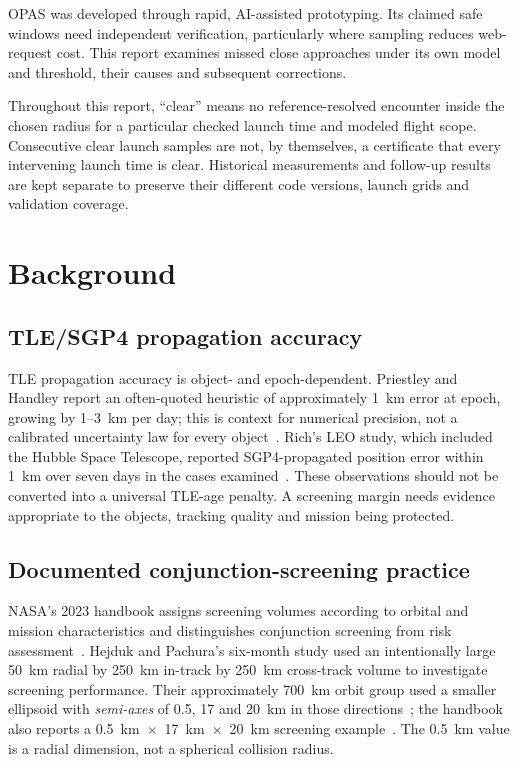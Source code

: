 \documentclass[11pt,a4paper]{article}
\begin{document}
OPAS was developed through rapid, AI-assisted prototyping. Its claimed
safe windows need independent verification, particularly where sampling
reduces web-request cost. This report examines missed close approaches
under its own model and threshold, their causes and subsequent corrections.

Throughout this report, ``clear'' means no reference-resolved encounter
inside the chosen radius for a particular checked launch time and modeled
flight scope. Consecutive clear launch samples are not, by themselves, a
certificate that every intervening launch time is clear. Historical
measurements and follow-up results are kept separate to preserve their
different code versions, launch grids and validation coverage.

\section{Background}
\label{sec:background}

\subsection{TLE/SGP4 propagation accuracy}

TLE propagation accuracy is object- and epoch-dependent. Priestley and
Handley report an often-quoted heuristic of approximately 1~km error at
epoch, growing by 1--3~km per day; this is context for numerical precision,
not a calibrated uncertainty law for every object~\cite{jaxsgp4}. Rich's
LEO study, which included the Hubble Space Telescope, reported
SGP4-propagated position error within 1~km over seven days in the cases
examined~\cite{afit_sgp4}. These observations should not be converted into
a universal TLE-age penalty. A screening margin needs evidence appropriate
to the objects, tracking quality and mission being protected.

\subsection{Documented conjunction-screening practice}

NASA's 2023 handbook assigns screening volumes according to orbital and
mission characteristics and distinguishes conjunction screening from risk
assessment~\cite{nasa_handbook}. Hejduk and Pachura's six-month study used
an intentionally large 50~km radial by 250~km in-track by 250~km cross-track
volume to investigate screening performance. Their approximately 700~km
orbit group used a smaller ellipsoid with \emph{semi-axes} of 0.5, 17 and
20~km in those directions~\cite{nasa_screening}; the handbook also reports
a 0.5~km~$\times$~17~km~$\times$~20~km screening example~\cite{nasa_handbook}.
The 0.5~km value is a radial dimension, not a spherical collision radius.
\end{document}
